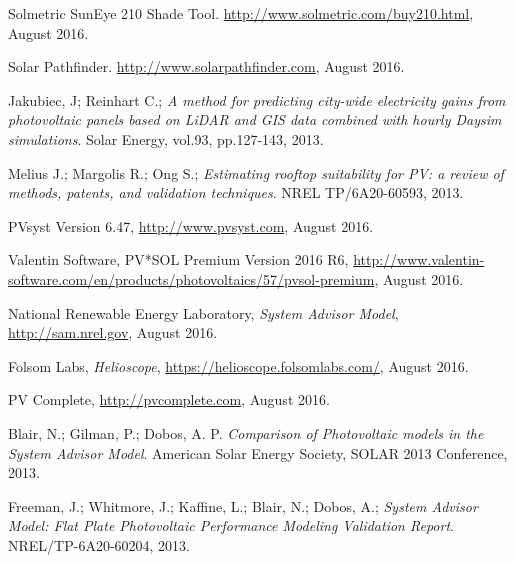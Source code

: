 \documentclass[twocolumn,10pt]{asme2ej}
\begin{document}
%

\begin{thebibliography}{8}

 Solmetric SunEye 210 Shade Tool. \url{http://www.solmetric.com/buy210.html}, August 2016.

 Solar Pathfinder. \url{http://www.solarpathfinder.com}, August 2016.


 Jakubiec, J; Reinhart C.; \emph{A method for predicting city-wide electricity gains from photovoltaic panels based on LiDAR and GIS data combined with hourly Daysim simulations}. Solar Energy, vol.93, pp.127-143, 2013.

  Melius J.; Margolis R.; Ong S.; \emph{Estimating rooftop suitability for PV: a review of methods, patents, and validation techniques}. NREL TP/6A20-60593, 2013.

 PVsyst Version 6.47, \url{http://www.pvsyst.com}, August 2016.

 Valentin Software, PV*SOL Premium Version 2016 R6, \url{http://www.valentin-software.com/en/products/photovoltaics/57/pvsol-premium}, August 2016.

 National Renewable Energy Laboratory, \emph{System Advisor Model}, \url{http://sam.nrel.gov}, August 2016.

 Folsom Labs, \emph{Helioscope}, \url{https://helioscope.folsomlabs.com/}, August 2016.

 PV Complete, \url{http://pvcomplete.com}, August 2016.

 Blair, N.; Gilman, P.; Dobos, A. P. \emph{Comparison of Photovoltaic models in the System Advisor Model}. American Solar Energy Society, SOLAR 2013 Conference, 2013.

 Freeman, J.; Whitmore, J.; Kaffine, L.; Blair, N.; Dobos, A.; \emph{System Advisor Model: Flat Plate Photovoltaic Performance Modeling Validation Report}. NREL/TP-6A20-60204, 2013.


\end{thebibliography}
\end{document}
